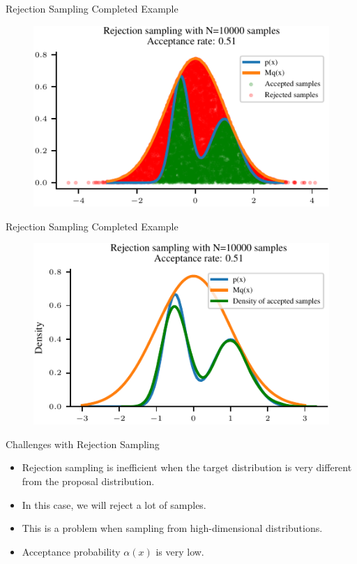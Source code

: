 \documentclass[handout]{beamer}
\begin{document}
    \begin{frame}{Rejection Sampling Completed Example}
        \begin{figure}
            \centering
            \includegraphics{../figures/sampling/rejection-sampling-N10000-False.pdf}
        \end{figure}
    \end{frame}

    \begin{frame}{Rejection Sampling Completed Example}
        \begin{figure}
            \centering
            \includegraphics{../figures/sampling/rejection-sampling-N10000-True.pdf}
        \end{figure}
    \end{frame}
        

    \begin{frame}{Challenges with Rejection Sampling}
        \begin{itemize}
            \item Rejection sampling is inefficient when the target distribution is very different from the proposal distribution.
            \item In this case, we will reject a lot of samples.
            \item This is a problem when sampling from high-dimensional distributions.
            \item Acceptance probability $\alpha(x)$ is very low.
        \end{itemize}
        
    \end{frame}
    
\end{document}
